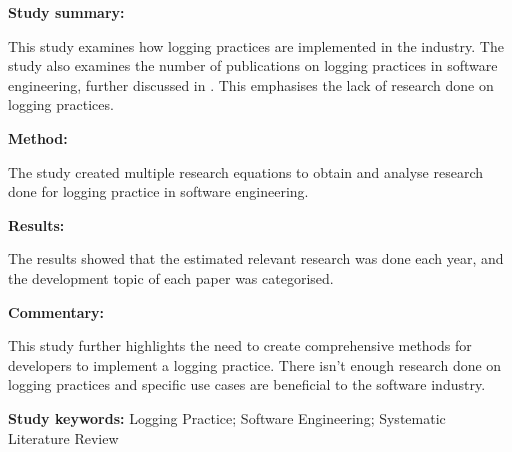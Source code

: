 \begin{tcolorbox}[colback=gray!5!white, colframe=pastelgreen!40!black, title=A Systematic Review of Logging Practice in Software Engineering\cite{Rong2018}]
	\begin{minipage}[t]{0.25\textwidth}
		\textbf{Study summary:}
	\end{minipage}
	\hfill
	\begin{minipage}[t]{0.65\textwidth}
		This study examines how logging practices are implemented in the industry. The study also
		examines the number of publications on logging practices in software engineering, further
		discussed in . This emphasises the lack of research done on
		logging practices.
	\end{minipage}

	\vspace{0.75em} 

	\begin{minipage}[t]{0.25\textwidth}
		\textbf{Method:}
	\end{minipage}
	\hfill
	\begin{minipage}[t]{0.65\textwidth}
		The study created multiple research equations to obtain and analyse research done for logging practice in software engineering.
	\end{minipage}

	\vspace{0.75em} 

	\begin{minipage}[t]{0.25\textwidth}
		\textbf{Results:}
	\end{minipage}
	\hfill
	\begin{minipage}[t]{0.65\textwidth}
		The results showed that the estimated relevant research was done each year, and the development topic of each paper was categorised.
	\end{minipage}

	\vspace{0.75em} 

	\begin{minipage}[t]{0.25\textwidth}
		\textbf{Commentary:}
	\end{minipage}
	\hfill
	\begin{minipage}[t]{0.65\textwidth}
		This study further highlights the need to create comprehensive methods for developers to
		implement a logging practice. There isn't enough research done on logging practices and
		specific use cases are beneficial to the software industry. 
	\end{minipage}
	\tcblower
	\textbf{Study keywords:} Logging Practice; Software Engineering; Systematic Literature Review
\end{tcolorbox}

